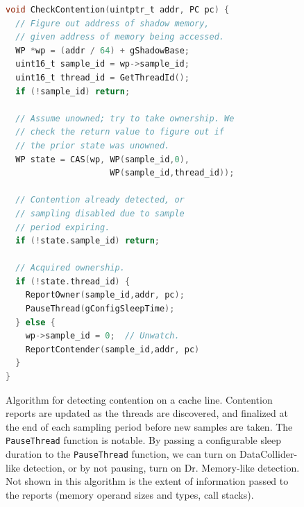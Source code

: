 \documentclass[letterpaper,twocolumn,10pt]{article}
\newcommand{\TextToolname}{Malcontent}
\newcommand{\Toolname}{\textsc{\TextToolname{}}}
\begin{document}
\begin{figure}[t]
\begin{lstlisting}[language=C,basicstyle=\footnotesize\ttfamily]
void CheckContention(uintptr_t addr, PC pc) {
  // Figure out address of shadow memory,
  // given address of memory being accessed.
  WP *wp = (addr / 64) + gShadowBase;
  uint16_t sample_id = wp->sample_id;
  uint16_t thread_id = GetThreadId();
  if (!sample_id) return;

  // Assume unowned; try to take ownership. We
  // check the return value to figure out if
  // the prior state was unowned.
  WP state = CAS(wp, WP(sample_id,0),
                     WP(sample_id,thread_id));

  // Contention already detected, or
  // sampling disabled due to sample
  // period expiring.
  if (!state.sample_id) return;

  // Acquired ownership.
  if (!state.thread_id) {
    ReportOwner(sample_id,addr, pc);
    PauseThread(gConfigSleepTime);
  } else {
    wp->sample_id = 0;  // Unwatch.
    ReportContender(sample_id,addr, pc)
  }
}
\end{lstlisting}
\caption{\label{fig:algorithm}Algorithm for detecting contention on a cache line. Contention reports are updated as the threads %
are discovered, and finalized at the end of each sampling period before new samples are taken. The \texttt{PauseThread} function %
is notable. By passing a configurable sleep duration to the \texttt{PauseThread} function, we can turn on DataCollider-like detection, %
or by not pausing, turn on Dr. Memory-like detection. Not shown in this algorithm is the extent of information passed to the reports %
(memory operand sizes and types, call stacks).}
\end{figure}




\end{document}
